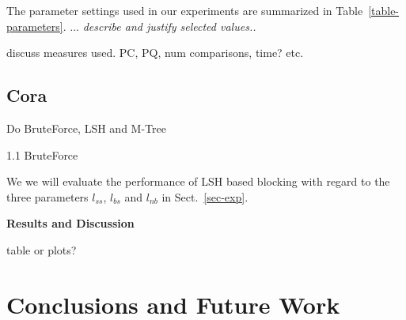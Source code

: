 \documentclass{llncs}
\begin{document}
The parameter settings used in our experiments are summarized in
Table~\ref{table-parameters}. ... \emph{describe and justify selected
values..}

discuss measures used. PC, PQ, num comparisons, time? etc.

\subsection{Cora}

Do BruteForce, LSH and M-Tree

1.1 BruteForce

We we will evaluate the performance of LSH based blocking with regard to the three parameters $l_{ss}$, $l_{bs}$ and $l_{nb}$ in
Sect.~\ref{sec-exp}.


\smallskip
\textbf{Results and Discussion}


table or plots?


\section{Conclusions and Future Work}
\label{sec-concl}



%
 

\end{document}
